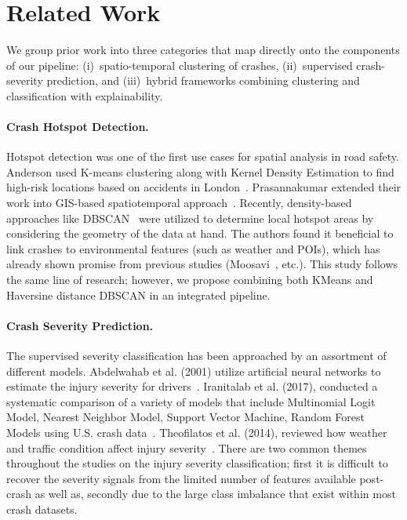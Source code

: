 \documentclass{article}
\begin{document}
\section{Related Work}
\label{sec:related}

We group prior work into three categories that map directly onto the components
of our pipeline: (i)~spatio-temporal clustering of crashes, (ii)~supervised
crash-severity prediction, and (iii)~hybrid frameworks combining clustering and
classification with explainability.

\paragraph{Crash Hotspot Detection.}
Hotspot detection was one of the first use cases for spatial analysis in
road safety. Anderson used K-means clustering along with Kernel Density
Estimation to find high-risk locations based on accidents in
London~\cite{anderson2009kernel}. Prasannakumar extended their work into
GIS-based spatiotemporal approach~\cite{prasannakumar2011spatio}. Recently,
density-based approaches like DBSCAN~\cite{ester1996dbscan} were utilized to
determine local hotspot areas by considering the geometry of the data at
hand. The authors found it beneficial to link crashes to environmental
features (such as weather and POIs), which has already shown promise from
previous studies (Moosavi~\cite{moosavi2019accident}, etc.). This study
follows the same line of research; however, we propose combining both
KMeans and Haversine distance DBSCAN in an integrated pipeline.

\paragraph{Crash Severity Prediction.}
The supervised severity classification has been approached by an assortment
of different models. Abdelwahab et al. (2001) utilize artificial neural
networks to estimate the injury severity for
drivers~\cite{abdelwahab2001modeling}. Iranitalab et al. (2017), conducted a
systematic comparison of a variety of models that include Multinomial Logit
Model, Nearest Neighbor Model, Support Vector Machine, Random Forest Models
using U.S. crash data~\cite{iranitalab2017comparison}. Theofilatos et al.
(2014), reviewed how weather and traffic condition affect injury
severity~\cite{theofilatos2014review}. There are two common themes
throughout the studies on the injury severity classification; first it is
difficult to recover the severity signals from the limited number of
features available post-crash as well as, secondly due to the large class
imbalance that exist within most crash datasets.
\end{document}
